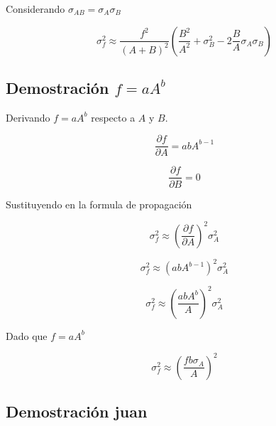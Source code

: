 \documentclass[a4paper,12pt]{article} %
\begin{document}
		Considerando $\sigma_{AB} = \sigma_A\sigma_B$
		
		\[
		\sigma_f^2 \approx \frac{f^2}{(A+B)^2} \left( \frac{B^2}{A^2}  +  \sigma_B^2 - 2 \frac{B}{A} \sigma_A \sigma_B \right)
		\]
		
		\subsection{Demostraci\'on $f = aA^{b}$}
		
		Derivando $f = aA^{b}$ respecto a $A$ y $B$.
		
		\[
		\frac{\partial f}{\partial A} =  a b A^{b-1}
		\]
		
		\[
		\frac{\partial f}{\partial B} = 0
		\]
		
		Sustituyendo en la formula de propagaci\'on 
		
		\[
		\sigma_f^2 \approx \left( \frac{\partial f}{\partial A}  \right)^2 \sigma_A^2
		\]
		
		\[
		\sigma_f^2 \approx \left( a b A^{b-1} \right)^2 \sigma_A^2
		\]
		
		\[
		\sigma_f^2 \approx \left(\frac{a b A^{b}}{A}  \right)^2 \sigma_A^2
		\]
		
		Dado que $f = aA^{b}$ 
		
		
		
		\[
		\sigma_f^2 \approx \left( \frac{f b \sigma_A}{A} \right)^2
		\]
		
		
		\subsection{Demostraci\'on juan}

	
\end{document}
